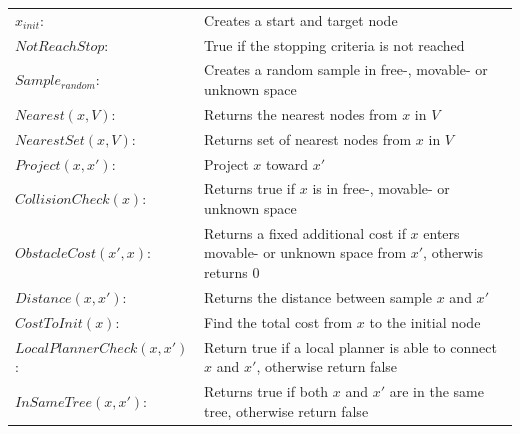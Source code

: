 \begin{center}
\begin{tabular}[t]{l p{10cm}}
$x_{init}$:& Creates a start and target node\\ 
$NotReachStop$:& True if the stopping criteria is not reached\\ 
$Sample_{random}$:& Creates a random sample in free-, movable- or unknown space\\
$Nearest(x, V)$:& Returns the nearest nodes from $x$ in $V$\\
$NearestSet(x, V)$:& Returns set of nearest nodes from $x$ in $V$\\
$Project(x, x')$:& Project $x$ toward $x'$\\
$CollisionCheck(x)$:& Returns true if $x$ is in free-, movable- or unknown space\\
$ObstacleCost(x', x)$:& Returns a fixed additional cost if $x$ enters movable- or unknown space from $x'$, otherwis returns 0\\
$Distance(x, x')$:& Returns the distance between sample $x$ and $x'$\\
$CostToInit(x)$:& Find the total cost from $x$ to the initial node\\
$LocalPlannerCheck(x, x')$:& Return true if a local planner is able to connect $x$ and $x'$, otherwise return false \\
$InSameTree(x, x')$:& Returns true if both $x$ and $x'$ are in the same tree, otherwise return false\\
\end{tabular}
\end{center}

